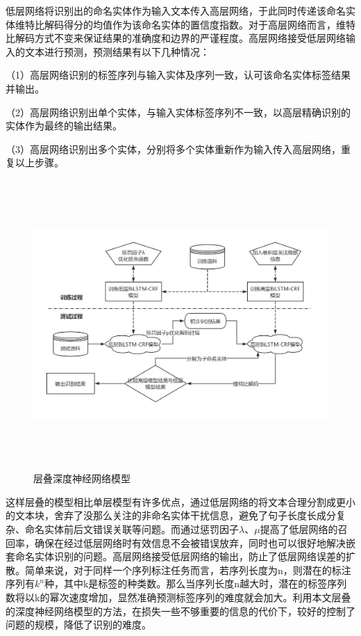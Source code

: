 \documentclass[winfonts,master,oneside,nobackinfo]{njuthesis}
\begin{document}
低层网络将识别出的命名实体作为输入文本传入高层网络，于此同时传递该命名实体维特比解码得分的均值作为该命名实体的置信度指数。对于高层网络而言，维特比解码方式不变来保证结果的准确度和边界的严谨程度。高层网络接受低层网络输入的文本进行预测，预测结果有以下几种情况：

（1）高层网络识别的标签序列与输入实体及序列一致，认可该命名实体标签结果并输出。

（2）高层网络识别出单个实体，与输入实体标签序列不一致，以高层精确识别的实体作为最终的输出结果。

（3）高层网络识别出多个实体，分别将多个实体重新作为输入传入高层网络，重复以上步骤。



\begin{figure}[H]
\centering
\begin{minipage}[t]{\textwidth}
\includegraphics[width=1.1\textwidth,height=11cm]{./figure/层叠模型流程.jpg}
\caption{层叠深度神经网络模型}
\label{lab:1}
\end{minipage}
\end{figure}

这样层叠的模型相比单层模型有许多优点，通过低层网络的将文本合理分割成更小的文本块，舍弃了没那么关注的非命名实体干扰信息，避免了句子长度长成分复杂、命名实体前后文错误关联等问题。而通过惩罚因子$\lambda$、$\mu$提高了低层网络的召回率，确保在经过低层网络时有效信息不会被错误放弃，同时也可以很好地解决嵌套命名实体识别的问题。高层网络接受低层网络的输出，防止了低层网络误差的扩散。简单来说，对于同样一个序列标注任务而言，若序列长度为n，则潜在的标注序列有$k^n$种，其中k是标签的种类数。那么当序列长度n越大时，潜在的标签序列数将以k的幂次速度增加，显然准确预测标签序列的难度就会加大。利用本文层叠的深度神经网络模型的方法，在损失一些不够重要的信息的代价下，较好的控制了问题的规模，降低了识别的难度。
\end{document}
